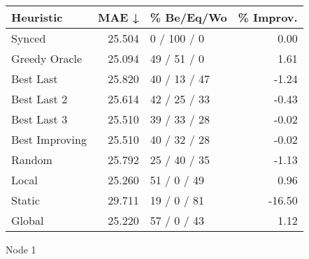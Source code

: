 \begin{tabular}{lrlr}
\toprule
\textbf{Heuristic} & \textbf{MAE ↓} & \textbf{\% Be/Eq/Wo} & \textbf{\% Improv.} \\
\midrule
            Synced &         25.504 &          0 / 100 / 0 &                0.00 \\
     Greedy Oracle &         25.094 &          49 / 51 / 0 &                1.61 \\
         Best Last &         25.820 &         40 / 13 / 47 &               -1.24 \\
       Best Last 2 &         25.614 &         42 / 25 / 33 &               -0.43 \\
       Best Last 3 &         25.510 &         39 / 33 / 28 &               -0.02 \\
    Best Improving &         25.510 &         40 / 32 / 28 &               -0.02 \\
            Random &         25.792 &         25 / 40 / 35 &               -1.13 \\
             Local &         25.260 &          51 / 0 / 49 &                0.96 \\
            Static &         29.711 &          19 / 0 / 81 &              -16.50 \\
            Global &         25.220 &          57 / 0 / 43 &                1.12 \\
\bottomrule
\end{tabular}
\caption{Node 1}
\label{tab:iid_lr05_le2_bs4_1}

